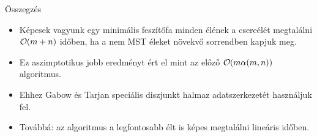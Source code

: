 \begin{frame}{Összegzés}
  \begin{itemize}
    \item Képesek vagyunk egy minimális feszítőfa minden élének a csereélét megtalálni $ \bigO (m  + n) $ időben, ha a nem MST éleket növekvő sorrendben kapjuk meg.
    \item Ez aszimptotikus jobb eredményt ért el mint az előző $ \bigO (m \alpha (m, n))$ algoritmus.
    \item Ehhez Gabow és Tarjan speciális diszjunkt halmaz adatszerkezetét használjuk fel.
    \item Továbbá: az algoritmus a legfontosabb élt is képes megtalálni lineáris időben.
  \end{itemize}
\end{frame}